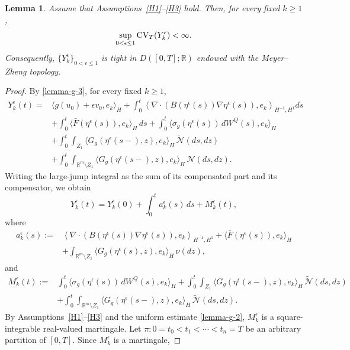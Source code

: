 \documentclass[11pt]{article}
\theoremstyle{plain}
\newtheorem{lemma}[theorem]{Lemma}
\numberwithin{equation}{section}
\begin{document}
 
\begin{lemma}\label{lem:conditional-variation-Yk}
Assume that Assumptions~\ref{H1}--\ref{H3} hold. Then, for every fixed \(k\ge1\),
\[
\sup_{0<\epsilon\le1}{\rm CV}_{T}(Y_k^\epsilon)<\infty .
\]
Consequently, \(\{Y_k^\epsilon\}_{0<\epsilon\le1}\) is tight in \(D([0,T];\mathbb R)\) endowed with the Meyer--Zheng topology.
\end{lemma}

\begin{proof}
By \eqref{lemma-g-3}, for every fixed \(k\ge1\),
\[
\begin{aligned}
Y_k^\epsilon(t)={}&\langle g(u_0)+\epsilon v_0,e_k\rangle_H +\int_0^t\left\langle\nabla\cdot\left(B(\eta^\epsilon(s))\nabla\eta^\epsilon(s)\right),e_k
\right\rangle_{H^{-1},H^1} ds  \\
&+\int_0^t\langle \bar F(\eta^\epsilon(s)),e_k\rangle_H\,ds   +\int_0^t\langle \sigma_g(\eta^\epsilon(s))\,dW^Q(s),e_k\rangle_H  \\
&+\int_0^t\int_{Z_1}\langle G_g(\eta^\epsilon(s-),z),e_k\rangle_H\,\tilde{\mathcal N}(ds,dz)    \\
&+\int_0^t\int_{\mathbb R^m\setminus Z_1}\langle G_g(\eta^\epsilon(s-),z),e_k\rangle_H\,\mathcal N(ds,dz).
\end{aligned}
\]
Writing the large-jump integral as the sum of its compensated part and its
compensator, we obtain
\[
Y_k^\epsilon(t)=Y_k^\epsilon(0)+\int_0^t a_k^\epsilon(s)\,ds+M_k^\epsilon(t),
\]
where
\[
\begin{aligned}
a_k^\epsilon(s):={}&\left\langle\nabla\cdot\left(B(\eta^\epsilon(s))\nabla\eta^\epsilon(s)\right),e_k\right\rangle_{H^{-1},H^1} +\langle \bar F(\eta^\epsilon(s)),e_k\rangle_H   \\
&+\int_{\mathbb R^m\setminus Z_1}\langle G_g(\eta^\epsilon(s),z),e_k\rangle_H\,\nu(dz),
\end{aligned}
\]
and
\[
\begin{aligned}
M_k^\epsilon(t):={}&\int_0^t\langle \sigma_g(\eta^\epsilon(s))\,dW^Q(s),e_k\rangle_H    +\int_0^t\int_{Z_1}
\langle G_g(\eta^\epsilon(s-),z),e_k\rangle_H\, \tilde{\mathcal N}(ds,dz)                                            \\
&+\int_0^t\int_{\mathbb R^m\setminus Z_1}\langle G_g(\eta^\epsilon(s-),z),e_k\rangle_H\,\tilde{\mathcal N}(ds,dz).
\end{aligned}
\]
By Assumptions~\ref{H1}--\ref{H3} and the uniform estimate \eqref{lemma-g-2}, \(M_k^\epsilon\) is a square-integrable real-valued
martingale.
Let \(\pi: 0=t_0<t_1<\cdots<t_n=T \) be an arbitrary partition of \([0,T]\). Since \(M_k^\epsilon\) is a martingale,

\end{proof}
\end{document}
